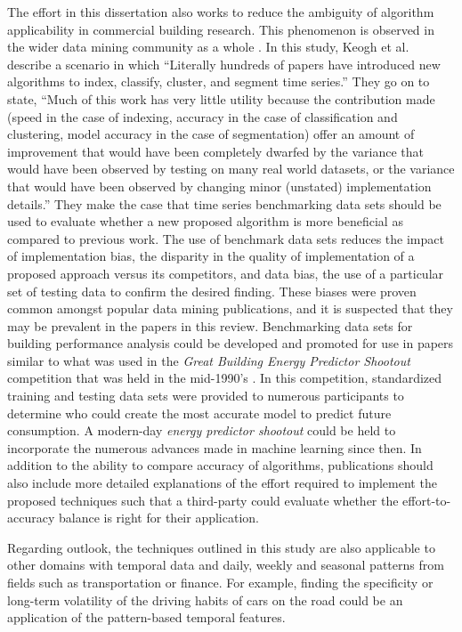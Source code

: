 The effort in this dissertation also works to reduce the ambiguity of algorithm applicability in commercial building research. This phenomenon is observed in the wider data mining community as a whole \citep{keogh_need_2003}. In this study, Keogh et al. describe a scenario in which ``Literally hundreds of papers have introduced new algorithms to index, classify, cluster, and segment time series.'' They go on to state, ``Much of this work has very little utility because the contribution made (speed in the case of indexing, accuracy in the case of classification and clustering, model accuracy in the case of segmentation) offer an amount of improvement that would have been completely dwarfed by the variance that would have been observed by testing on many real world datasets, or the variance that would have been observed by changing minor (unstated) implementation details.'' They make the case that time series benchmarking data sets should be used to evaluate whether a new proposed algorithm is more beneficial as compared to previous work. The use of benchmark data sets reduces the impact of implementation bias, the disparity in the quality of implementation of a proposed approach versus its competitors, and data bias, the use of a particular set of testing data to confirm the desired finding. These biases were proven common amongst popular data mining publications, and it is suspected that they may be prevalent in the papers in this review. Benchmarking data sets for building performance analysis could be developed and promoted for use in papers similar to what was used in the \emph{Great Building Energy Predictor Shootout} competition that was held in the mid-1990's \citep{kreider_predicting_1994}. In this competition, standardized training and testing data sets were provided to numerous participants to determine who could create the most accurate model to predict future consumption. A modern-day \emph{energy predictor shootout} could be held to incorporate the numerous advances made in machine learning since then. In addition to the ability to compare accuracy of algorithms, publications should also include more detailed explanations of the effort required to implement the proposed techniques such that a third-party could evaluate whether the effort-to-accuracy balance is right for their application.

Regarding outlook, the techniques outlined in this study are also applicable to other domains with temporal data and daily, weekly and seasonal patterns from fields such as transportation or finance. For example, finding the specificity or long-term volatility of the driving habits of cars on the road could be an application of the pattern-based temporal features.

